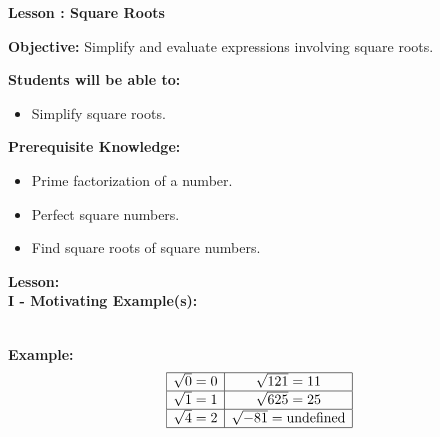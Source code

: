 \documentclass[12pt]{article}
\theoremstyle{definition}
\begin{document}
{\bf \large Lesson : Square Roots}\label{les:square_roots}
\hfill \doclicenseImage[imagewidth=5em]\\
\par
{\bf Objective:} Simplify and evaluate expressions involving square roots.\\
\par
{\bf Students will be able to:}
\begin{itemize}
	\item Simplify square roots.
\end{itemize}
{\bf Prerequisite Knowledge:}
\begin{itemize}
	\item Prime factorization of a number.
	\item Perfect square numbers.
	\item Find square roots of square numbers.
\end{itemize}
\hrulefill

{\bf Lesson:}\\
{\bf I - Motivating Example(s):}\\
\ \par
{\bf Example:}
  \[ \begin{array}{|c|c|}
       \hline
       \sqrt{0} = 0 & \sqrt{121} = 11\\
       \hline
       \sqrt{1} = 1 & \sqrt{625} = 25\\
       \hline
       \sqrt{4} = 2 & \sqrt{- 81} = \text{undefined}\\
       \hline
     \end{array} \]
\end{document}
